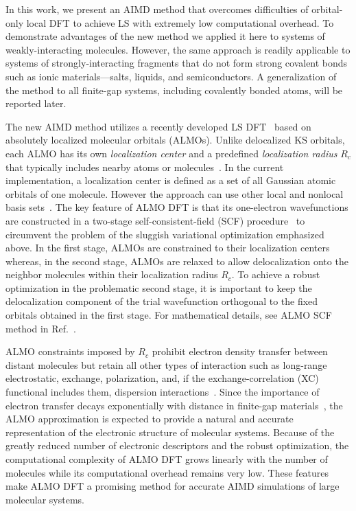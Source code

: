 \documentclass[aps,prl,reprint,amsmath,amssymb]{revtex4-1}
\begin{document}
In this work, we present an AIMD method that overcomes difficulties of orbital-only local DFT to achieve LS with extremely low computational overhead. 
To demonstrate advantages of the new method we applied it here to systems of weakly-interacting molecules. 
However, the same approach is readily applicable to systems of strongly-interacting fragments that do not form strong covalent bonds such as ionic materials---salts, liquids, and semiconductors. 
A generalization of the method to all finite-gap systems, including covalently bonded atoms, will be reported later. 

The new AIMD method utilizes a recently developed LS DFT~\cite{a:almo-ls} based on absolutely localized molecular orbitals (\mbox{ALMOs}). 
Unlike delocalized KS orbitals, each \mbox{ALMO} has its own \emph{localization center} and a predefined \emph{localization radius} $R_{c}$ that typically includes nearby atoms or molecules~\cite{a:stoll,a:almo-ls}. 
In the current implementation, a localization center is defined as a set of all Gaussian atomic orbitals of one molecule. 
However the approach can use other local and nonlocal basis sets~\cite{a:ls-galli-parrinello-1992, Lin2012}. 
The key feature of ALMO DFT is that its one-electron wavefunctions are constructed in a two-stage self-consistent-field (SCF) procedure~\cite{a:almo-ls} to circumvent the problem of the sluggish variational optimization emphasized above. 
In the first stage, ALMOs are constrained to their localization centers~\cite{a:khal} whereas, in the second stage, ALMOs are relaxed to allow delocalization onto the neighbor molecules within their localization radius $R_{c}$. 
To achieve a robust optimization in the problematic second stage, it is important to keep the delocalization component of the trial wavefunction orthogonal to the fixed orbitals obtained in the first stage. 
For mathematical details, see ALMO SCF method in Ref.~.

ALMO constraints imposed by $R_c$ prohibit electron density transfer between distant molecules but retain all other types of interaction such as long-range electrostatic, exchange, polarization, and, if the exchange-correlation (XC) functional includes them, dispersion interactions~\cite{a:theeda}. 
Since the importance of electron transfer decays exponentially with distance in finite-gap materials~\cite{a:ls-rev-1999}, the \mbox{ALMO} approximation is expected to provide a natural and accurate representation of the electronic structure of molecular systems. %
Because of the greatly reduced number of electronic descriptors and the robust optimization, the computational complexity of ALMO DFT grows linearly with the number of molecules while its computational overhead remains very low. These features make ALMO DFT a promising method for accurate AIMD simulations of large molecular systems.
\end{document}
